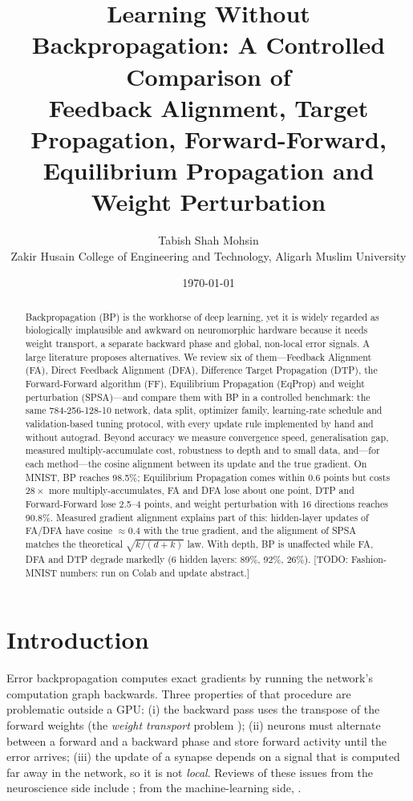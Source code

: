 \documentclass[11pt]{article}
\title{Learning Without Backpropagation: A Controlled Comparison of \\ Feedback Alignment, Target Propagation, Forward-Forward, Equilibrium Propagation and Weight Perturbation}
\author{Tabish Shah Mohsin \\ Zakir Husain College of Engineering and Technology, Aligarh Muslim University}
\date{\today}
\newcommand{\todo}[1]{{\color{red}[TODO: #1]}}
\begin{document}
\maketitle

\begin{abstract}
Backpropagation (BP) is the workhorse of deep learning, yet it is widely regarded as biologically implausible and awkward on neuromorphic hardware because it needs weight transport, a separate backward phase and global, non-local error signals. A large literature proposes alternatives. We review six of them---Feedback Alignment (FA), Direct Feedback Alignment (DFA), Difference Target Propagation (DTP), the Forward-Forward algorithm (FF), Equilibrium Propagation (EqProp) and weight perturbation (SPSA)---and compare them with BP in a controlled benchmark: the same 784-256-128-10 network, data split, optimizer family, learning-rate schedule and validation-based tuning protocol, with every update rule implemented by hand and without autograd. Beyond accuracy we measure convergence speed, generalisation gap, measured multiply-accumulate cost, robustness to depth and to small data, and---for each method---the cosine alignment between its update and the true gradient. On MNIST, BP reaches 98.5\%; Equilibrium Propagation comes within 0.6 points but costs $28\times$ more multiply-accumulates, FA and DFA lose about one point, DTP and Forward-Forward lose 2.5--4 points, and weight perturbation with 16 directions reaches 90.8\%. Measured gradient alignment explains part of this: hidden-layer updates of FA/DFA have cosine $\approx0.4$ with the true gradient, and the alignment of SPSA matches the theoretical $\sqrt{k/(d+k)}$ law. With depth, BP is unaffected while FA, DFA and DTP degrade markedly (6 hidden layers: 89\%, 92\%, 26\%). \todo{Fashion-MNIST numbers: run on Colab and update abstract.}
\end{abstract}

\section{Introduction}
Error backpropagation \cite{rumelhart1986} computes exact gradients by running the network's computation graph backwards. Three properties of that procedure are problematic outside a GPU: (i) the backward pass uses the transpose of the forward weights (the \emph{weight transport} problem \cite{grossberg1987,crick1989}); (ii) neurons must alternate between a forward and a backward phase and store forward activity until the error arrives; (iii) the update of a synapse depends on a signal that is computed far away in the network, so it is not \emph{local}. Reviews of these issues from the neuroscience side include \cite{whittington2019,lillicrap2020}; from the machine-learning side, \cite{bartunov2018,xiao2018,baydin2022}.
\end{document}
